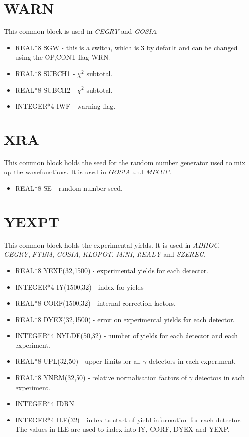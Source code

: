 \section{WARN}

This common block is used in {\em CEGRY} and {\em GOSIA}.

\begin{itemize}
\item REAL*8 SGW - this is a switch, which is 3 by default and can be
changed using the OP,CONT flag WRN.
\item REAL*8 SUBCH1 - $\chi^2$ subtotal.
\item REAL*8 SUBCH2 - $\chi^2$ subtotal.
\item INTEGER*4 IWF - warning flag.
\end{itemize}

\section{XRA}

This common block holds the seed for the random number generator used to mix
up the wavefunctions. It is used in {\em GOSIA} and {\em MIXUP}.

\begin{itemize}
\item REAL*8 SE - random number seed.
\end{itemize}

\section{YEXPT}

This common block holds the experimental yields. It is used in {\em ADHOC},
{\em CEGRY}, {\em FTBM}, {\em GOSIA}, {\em KLOPOT}, {\em MINI}, {\em READY}
and {\em SZEREG}.

\begin{itemize}
\item REAL*8 YEXP(32,1500) - experimental yields for each detector.
\item INTEGER*4 IY(1500,32) - index for yields
\item REAL*8 CORF(1500,32) - internal correction factors.
\item REAL*8 DYEX(32,1500) - error on experimental yields for each detector.
\item INTEGER*4 NYLDE(50,32) - number of yields for each detector and each
experiment.
\item REAL*8 UPL(32,50) - upper limits for all $\gamma$ detectors in each
experiment.
\item REAL*8 YNRM(32,50) - relative normalisation factors of $\gamma$
detectors in each experiment.
\item INTEGER*4 IDRN
\item INTEGER*4 ILE(32) - index to start of yield information for each
detector. The values in ILE are used to index into IY, CORF, DYEX and YEXP.
\end{itemize}

